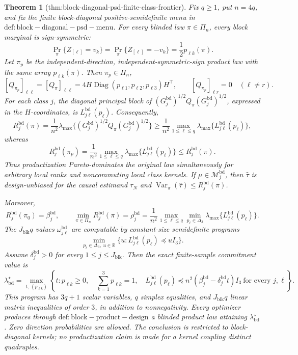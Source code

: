 \documentclass{article}
\newtheorem{theorem}{Theorem}
\begin{document}
\begin{theorem}[thm:block-diagonal-psd-finite-class-frontier]\label{thm:block-diagonal-psd-finite-class-frontier}
Fix \(q\ge1\), put \(n=4q\), and fix the finite block-diagonal positive-semidefinite menu in \(\mathrm{def:block-diagonal-psd-menu}\).  For every blinded law \(\pi\in\Pi_n\), every block marginal is sign-symmetric:
\[
\Pr_\pi\{Z_{[\ell]}=v_k\}
=\Pr_\pi\{Z_{[\ell]}=-v_k\}
=\frac12p_{\ell k}(\pi).
\]
Let \(\pi_p\) be the independent-direction, independent-symmetric-sign product law with the same array \(p_{\ell k}(\pi)\). Then \(\pi_p\in\Pi_n\),
\[
[Q_{\pi_p}]_{\ell\ell}=[Q_\pi]_{\ell\ell}
=4H\operatorname{Diag}(p_{\ell1},p_{\ell2},p_{\ell3})H^\top,
\qquad
[Q_{\pi_p}]_{\ell r}=0\quad(\ell\ne r).
\]
For each class \(j\), the diagonal principal block of \((G_j^{\mathrm{bd}})^{1/2}Q_\pi(G_j^{\mathrm{bd}})^{1/2}\), expressed in the \(H\)-coordinates, is \(L^{\mathrm{bd}}_{j\ell}(p_\ell)\). Consequently,
\[
R_j^{\mathrm{bd}}(\pi)
=\frac1{n^2}\lambda_{\max}\{(G_j^{\mathrm{bd}})^{1/2}Q_\pi(G_j^{\mathrm{bd}})^{1/2}\}
\ge\frac1{n^2}\max_{1\le\ell\le q}\lambda_{\max}\{L^{\mathrm{bd}}_{j\ell}(p_\ell)\},
\]
whereas
\[
R_j^{\mathrm{bd}}(\pi_p)
=\frac1{n^2}\max_{1\le\ell\le q}\lambda_{\max}\{L^{\mathrm{bd}}_{j\ell}(p_\ell)\}
\le R_j^{\mathrm{bd}}(\pi).
\]
Thus productization Pareto-dominates the original law simultaneously for arbitrary local ranks and noncommuting local class kernels.  If \(\mu\in\mathcal M_j^{\mathrm{bd}}\), then \(\widehat\tau\) is design-unbiased for the causal estimand \(\tau_N\) and \(\operatorname{Var}_\pi(\widehat\tau)\le R_j^{\mathrm{bd}}(\pi)\).

Moreover,
\[
R_j^{\mathrm{bd}}(\pi_0)=\beta_j^{\mathrm{bd}},
\qquad
\min_{\pi\in\Pi_n}R_j^{\mathrm{bd}}(\pi)
=\rho_j^{\mathrm{bd}}
=\frac1{n^2}\max_{1\le\ell\le q}
\min_{p_\ell\in\Delta_3}\lambda_{\max}\{L^{\mathrm{bd}}_{j\ell}(p_\ell)\}.
\]
The \(J_{\mathrm{blk}}q\) values \(\omega^{\mathrm{bd}}_{j\ell}\) are computable by constant-size semidefinite programs
\[
\min_{p_\ell\in\Delta_3,\ u\in\mathbb R}
\{u:L^{\mathrm{bd}}_{j\ell}(p_\ell)\preceq uI_3\}.
\]
Assume \(\delta_j^{\mathrm{bd}}>0\) for every \(1\le j\le J_{\mathrm{blk}}\). Then the exact finite-sample commitment value is
\[
\boxed{
\lambda_{\mathrm{bd}}^\star
=\max_{t,\,(p_{\ell k})}
\left\{t:
p_{\ell k}\ge0,\quad
\sum_{k=1}^3p_{\ell k}=1,\quad
L^{\mathrm{bd}}_{j\ell}(p_\ell)
\preceq n^2(\beta_j^{\mathrm{bd}}-\delta_j^{\mathrm{bd}}t)I_3
\ \text{for every }j,\ell
\right\}.}
\]
This program has \(3q+1\) scalar variables, \(q\) simplex equalities, and \(J_{\mathrm{blk}}q\) linear matrix inequalities of order \(3\), in addition to nonnegativity. Every optimizer produces through \(\mathrm{def:block-product-design}\) a blinded product law attaining \(\lambda_{\mathrm{bd}}^\star\). Zero direction probabilities are allowed. The conclusion is restricted to block-diagonal kernels; no productization claim is made for a kernel coupling distinct quadruples.
\end{theorem}
\end{document}
